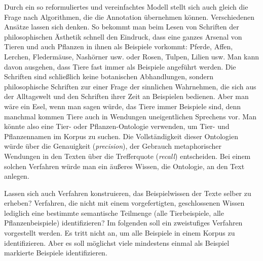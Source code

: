 \documentclass{article}
\newcommand*{\englisch}[1]{\foreignlanguage{english}{\textit{#1}}}%
\begin{document}
Durch ein so reformuliertes und vereinfachtes Modell stellt sich auch
gleich die Frage nach Algorithmen, die die Annotation übernehmen
können. Verschiedenen Ansätze lassen sich denken. So bekommt man beim
Lesen von Schriften der philosophischen Ästhetik schnell den Eindruck,
dass eine ganzes Arsenal von Tieren und auch Pflanzen in ihnen als
Beispiele vorkommt: Pferde, Affen, Lerchen, Fledermäuse, Nashörner
usw. oder Rosen, Tulpen, Lilien usw. Man kann davon ausgehen, dass
Tiere fast immer als Beispiele angeführt werden. Die Schriften sind
schließlich keine botanischen Abhandlungen, sondern philosophische
Schriften zur einer Frage der sinnlichen Wahrnehmen, die sich aus der
Alltagswelt und den Schriften ihrer Zeit an Beispielen bedienen. Aber
man wäre ein Esel, wenn man sagen würde, das Tiere immer Beispiele
sind, denn manchmal kommen Tiere auch in Wendungen uneigentlichen
Sprechens vor. Man könnte also eine Tier- oder Pflanzen-Ontologie
verwenden, um Tier- und Pflanzennamen im Korpus zu suchen. Die
Vollständigkeit dieser Ontologien würde über die Genauigkeit
(\englisch{precision}), der Gebrauch metaphorischer Wendungen in den
Texten über die Trefferquote (\englisch{recall}) entscheiden. Bei
einem solchen Verfahren würde man ein äußeres Wissen, die Ontologie,
an den Text anlegen. 

Lassen sich auch Verfahren konstruieren, das Beispielwissen der Texte
selber zu erheben? Verfahren, die nicht mit einem vorgefertigten,
geschlossenen Wissen lediglich eine bestimmte semantische Teilmenge
(alle Tierbeispiele, alle Pflanzenbeispiele) identifizieren? Im
folgenden soll ein zweistufiges Verfahren vorgestellt werden. Es tritt
nicht an, um alle Beispiele in einem Korpus zu identifizieren. Aber es
soll möglichst viele mindestens einmal als Beispiel markierte
Beispiele identifizieren.
\end{document}
